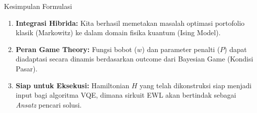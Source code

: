 \documentclass{beamer}
\begin{document}
\begin{frame}{Kesimpulan Formulasi}
    \begin{enumerate}
        \item \textbf{Integrasi Hibrida:} 
        Kita berhasil memetakan masalah optimasi portofolio klasik (Markowitz) ke dalam domain fisika kuantum (Ising Model).
        
        \item \textbf{Peran Game Theory:}
        Fungsi bobot ($w$) dan parameter penalti ($P$) dapat diadaptasi secara dinamis berdasarkan outcome dari Bayesian Game (Kondisi Pasar).
        
        \item \textbf{Siap untuk Eksekusi:}
        Hamiltonian $H$ yang telah dikonstruksi siap menjadi input bagi algoritma VQE, dimana sirkuit EWL akan bertindak sebagai \textit{Ansatz} pencari solusi.
    \end{enumerate}
\end{frame}
\end{document}
